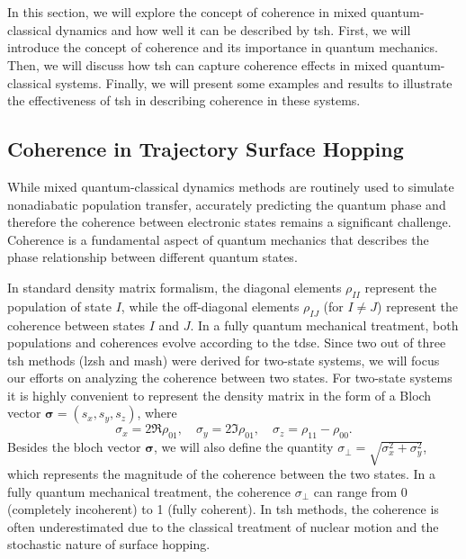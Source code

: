 \section{\filetotitle}\label{sec:coherence_in_mixed_qc_dynamics}
In this section, we will explore the concept of coherence in mixed quantum-classical dynamics and how well it can be described by \acrshort{tsh}. First, we will introduce the concept of coherence and its importance in quantum mechanics. Then, we will discuss how \acrshort{tsh} can capture coherence effects in mixed quantum-classical systems. Finally, we will present some examples and results to illustrate the effectiveness of \acrshort{tsh} in describing coherence in these systems.
\subsection{Coherence in Trajectory Surface Hopping}\label{sec:coherence_in_sh}
While mixed quantum-classical dynamics methods are routinely used to simulate nonadiabatic population transfer, accurately predicting the quantum phase and therefore the coherence between electronic states remains a significant challenge. Coherence is a fundamental aspect of quantum mechanics that describes the phase relationship between different quantum states.

In standard density matrix formalism, the diagonal elements $\rho_{II}$ represent the population of state $I$, while the off-diagonal elements $\rho_{IJ}$ (for $I\neq J$) represent the coherence between states $I$ and $J$. In a fully quantum mechanical treatment, both populations and coherences evolve according to the \acrshort{tdse}. Since two out of three \acrshort{tsh} methods (\acrshort{lzsh} and \acrshort{mash}) were derived for two-state systems, we will focus our efforts on analyzing the coherence between two states. For two-state systems it is highly convenient to represent the density matrix in the form of a Bloch vector $\symbf{\sigma}=(s_x,s_y,s_z)$, where
\begin{equation}
\sigma_x=2\Re\rho_{01},\quad\sigma_y=2\Im\rho_{01},\quad\sigma_z=\rho_{11}-\rho_{00}.
\end{equation}
Besides the bloch vector $\symbf{\sigma}$, we will also define the quantity $\sigma_\perp=\sqrt{\sigma_x^2+\sigma_y^2}$, which represents the magnitude of the coherence between the two states. In a fully quantum mechanical treatment, the coherence $\sigma_\perp$ can range from 0 (completely incoherent) to 1 (fully coherent). In \acrshort{tsh} methods, the coherence is often underestimated due to the classical treatment of nuclear motion and the stochastic nature of surface hopping.

